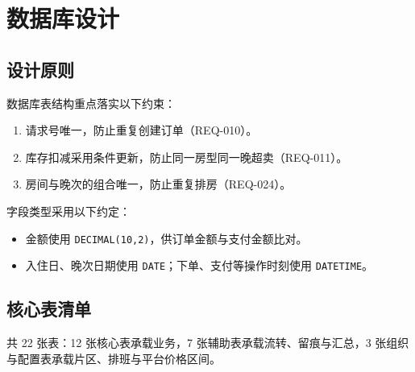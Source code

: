 \section{数据库设计}

\subsection{设计原则}

数据库表结构重点落实以下约束：

\begin{enumerate}[leftmargin=3.2em]
  \item 请求号唯一，防止重复创建订单（REQ-010）。
  \item 库存扣减采用条件更新，防止同一房型同一晚超卖（REQ-011）。
  \item 房间与晚次的组合唯一，防止重复排房（REQ-024）。
\end{enumerate}

字段类型采用以下约定：

\begin{itemize}
  \item 金额使用 \texttt{DECIMAL(10,2)}，供订单金额与支付金额比对。
  \item 入住日、晚次日期使用 \texttt{DATE}；下单、支付等操作时刻使用 \texttt{DATETIME}。
\end{itemize}

\subsection{核心表清单}

共 22 张表：12 张核心表承载业务，7 张辅助表承载流转、留痕与汇总，3 张组织与配置表承载片区、排班与平台价格区间。

